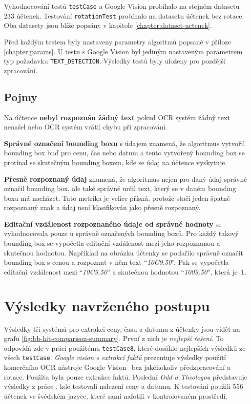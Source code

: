 \documentclass[thesis=B,czech]{FITthesis}[2019/12/23]
\def\myit#1{\texttt{#1}}
\begin{document}
Vyhodnocování testů \myit{testCase} a Google Vision probíhalo na stejném datasetu 233 účtenek. Testování \myit{rotationTest} probíhalo na datasetu účtenek bez rotace. Oba datasety jsou blíže popsány v kapitole \ref{chapter:dataset-uctenek}.

Před každým testem byly nastaveny parametry algoritmů popsané v příloze \ref{chapter:params}. U testu s Google Vision byl jediným nastaveným parametrem typ požadavku \myit{TEXT_DETECTION}. Výsledky testů byly uloženy pro pozdější zpracování.

\subsection{Pojmy}
Na účtence \textbf{nebyl rozpoznán žádný text} pokud OCR systém žádný text nenašel nebo OCR systém vrátil chybu při zpracování.

\textbf{Správné označení bounding boxu} s údajem znamená, že algoritmus vytvořil bounding box buď pro cenu, čas nebo datum a tento vytvořený bounding box se protínal se skutečným bounding boxem, kde se údaj na účtence vyskytuje.

\textbf{Přesně rozpoznaný údaj} znamená, že algoritmus nejen pro daný údaj správ\-ně označil bounding box, ale také správně určil text, který se v daném bounding boxu má nacházet. Tato metrika je velice přísná, protože stačí jeden špatně rozpoznaný znak a údaj není klasifikován jako přesně rozpoznaný.

\textbf{Editační vzdálenost rozpoznaného údaje od správné hodnoty} se vyhodnocovala pouze u správně označených bounding boxů. Pro každý takový bounding box se vypočetla editační vzdálenost mezi jeho rozpoznanou a skutečnou hodnotou. Například na obrázku účtenky se podařilo správně označit bounding box s cenou a rozpoznat v něm text \enquote{\textit{10C9.50}}. Pak se vypočetla editační vzdálenost mezi \enquote{\textit{10C9.50}} a skutečnou hodnotou \enquote{\textit{1009.50}}, která je~1.

\section{Výsledky navrženého postupu}
\label{sec:vysledky-navrzeneho-postupu}
Výsledky tří systémů pro extrakci ceny, času a datumu z účtenky jsou vidět na grafu \ref{fig:bb-hit-comparison-summary}. První z nich je \textit{nejlepší řešení}. To odpovídá zde v práci použitému \myit{testCase8}, které dosáhlo nejlepších výsledků ze všech \myit{testCase}. \textit{Google vision s extrakcí faktů} prezentuje výsledky použití komerčního OCR nástroje Google Vision~\cite{gvision} bez jakéhokoliv předzpracování a rotace. Použita byla pouze extrakce faktů. Poslední \textit{Odd a Theologou} představuje výsledky z práce \cite{Odd2018}, kde testovali nalezení ceny a datumu. K testování použili 556 účtenek ve švédském jazyce, které sami nafotili v kontrolovaném prostředí.
\end{document}
